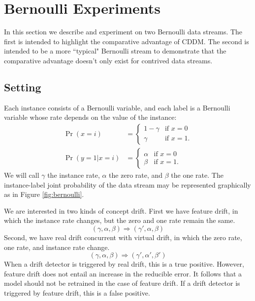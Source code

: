 
\section{Bernoulli Experiments} \label{Experiments:bernoulli}

In this section we describe and experiment on two Bernoulli data streams. The first is intended to highlight the comparative advantage of CDDM. The second is intended to be a more ``typical" Bernoulli stream to demonstrate that the comparative advantage doesn't only exist for contrived data streams.

\subsection{Setting}

Each instance consists of a Bernoulli variable, and each label is a Bernoulli variable whose rate depends on the value of the instance:
\begin{align}
  \Pr(x=i) &= \begin{cases}
    1-\gamma & \text{if }x=0 \\
    \gamma & \text{if }x=1.
    \end{cases} \\
  \Pr(y=1|x=i) &= \begin{cases}
    \alpha & \text{if }x=0 \\
    \beta & \text{if }x=1.
    \end{cases}
\end{align}
We will call $\gamma$ the instance rate, $\alpha$ the zero rate, and $\beta$ the one rate. The instance-label joint probability of the data stream may be represented graphically as in Figure \ref{fig:bernoulli}.

We are interested in two kinds of concept drift. First we have feature drift, in which the instance rate changes, but the zero and one rate remain the same.
\begin{equation}
  (\gamma,\alpha,\beta) \Rightarrow (\gamma',\alpha,\beta)
\end{equation}
Second, we have real drift concurrent with virtual drift, in which the zero rate, one rate, and instance rate change.
\begin{equation}
  (\gamma,\alpha,\beta) \Rightarrow (\gamma',\alpha',\beta')
\end{equation}
When a drift detector is triggered by real drift, this is a true positive. However, feature drift does not entail an increase in the reducible error. It follows that a model should not be retrained in the case of feature drift. If a drift detector is triggered by feature drift, this is a false positive.

